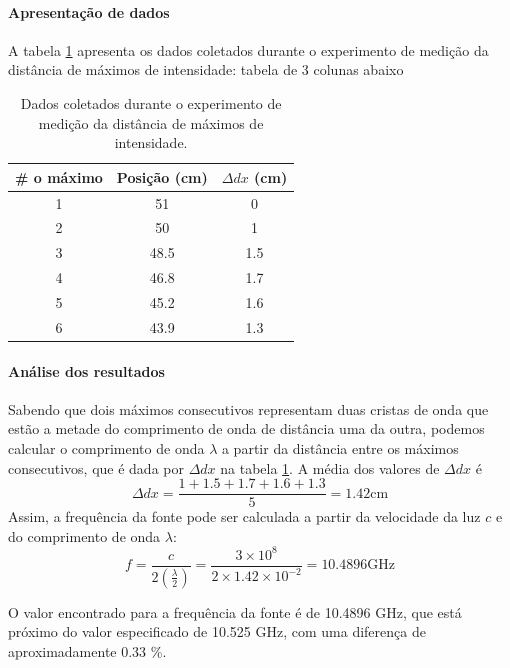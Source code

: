 \documentclass[12pt]{article}
\begin{document}
\paragraph{Apresentação de dados}

A tabela \ref{tab:metodo1dados} apresenta os dados coletados durante
o experimento de medição da distância de máximos de intensidade:
tabela de 3 colunas abaixo

\begin{table}[H]
  \centering
  \begin{tabular}{|c|c|c|}
    \hline
    \# o máximo & Posição (cm) & $\Delta dx$ (cm) \\
    \hline
    1 & 51 & 0 \\
    2 & 50 & 1 \\
    3 & 48.5 & 1.5 \\
    4 & 46.8 & 1.7 \\
    5 & 45.2 & 1.6 \\
    6 & 43.9 & 1.3 \\
    \hline
  \end{tabular}
  \caption{Dados coletados durante o experimento de medição da
  distância de máximos de intensidade.}
  \label{tab:metodo1dados}
\end{table}

\paragraph{Análise dos resultados}
Sabendo que dois máximos consecutivos representam duas cristas de onda que estão
a metade do comprimento de onda de distância uma da outra, podemos
calcular o comprimento de onda $\lambda$ a partir da distância entre
os máximos consecutivos, que é dada por $\Delta dx$ na tabela
\ref{tab:metodo1dados}. A média dos valores de $\Delta dx$ é
\begin{equation}
  \Delta dx = \frac{1 + 1.5 + 1.7 + 1.6 + 1.3}{5} = 1.42 \text{cm}
\end{equation}
Assim, a frequência da fonte pode ser calculada a partir da
velocidade da luz $c$ e do comprimento de onda $\lambda$:
\begin{equation}
  f = \frac{c}{2(\frac{\lambda}{2})} = \frac{3 \times 10^8 }{2 \times
  1.42 \times 10^{-2}} = 10.4896 \text{GHz}
\end{equation}

O valor encontrado para a frequência da fonte é de 10.4896 GHz, que
está próximo do valor especificado de 10.525 GHz, com uma diferença
de aproximadamente
0.33 \%.
\end{document}
